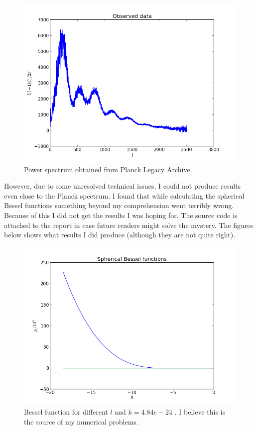 \documentclass[norsk,a4paper,12pt]{article}
\begin{document}
\begin{figure}[H] 
\begin{center} 
\includegraphics[scale=0.5]{plank_data.png} 
 

\caption{Power spectrum obtained from Planck Legacy Archive.} 
\end{center} 
\end{figure}

However, due to some unresolved technical issues, I could not produce results even close to the Planck spectrum. I found that while calculating the spherical Bessel functions something beyond my comprehension went terribly wrong. Because of this I did not get the results I was hoping for. The source code is attached to the report in case future readers might solve the mystery. The figures below shows what results I did produce (although they are not quite right). 

\begin{figure}[H] 
\begin{center} 
\includegraphics[scale=0.5]{j_l.png} 
 

\caption{Bessel function for different $l$ and $k = 4.84e-24$ . I believe this is the source of my numerical problems.} 
\end{center} 
\end{figure}
\end{document}
